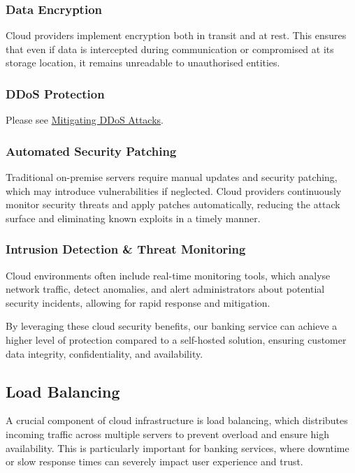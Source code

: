 \documentclass{article}
\begin{document}
	\subsubsection{Data Encryption}
	\par Cloud providers implement encryption both in transit and at rest. This ensures that even if data is intercepted during communication or compromised at its storage location, it remains unreadable to unauthorised entities.
	\subsubsection{DDoS Protection}
	\par Please see \hyperref[sec:mitigatingddos]{Mitigating DDoS Attacks}.
	\subsubsection{Automated Security Patching}
	\par Traditional on-premise servers require manual updates and security patching, which may introduce vulnerabilities if neglected. Cloud providers continuously monitor security threats and apply patches automatically, reducing the attack surface and eliminating known exploits in a timely manner.
	\subsubsection{Intrusion Detection \& Threat Monitoring}
	\par Cloud environments often include real-time monitoring tools, which analyse network traffic, detect anomalies, and alert administrators about potential security incidents, allowing for rapid response and mitigation.
	\par By leveraging these cloud security benefits, our banking service can achieve a higher level of protection compared to a self-hosted solution, ensuring customer data integrity, confidentiality, and availability.
	\subsection{Load Balancing}
	\par A crucial component of cloud infrastructure is load balancing, which distributes incoming traffic across multiple servers to prevent overload and ensure high availability. This is particularly important for banking services, where downtime or slow response times can severely impact user experience and trust.
\end{document}
